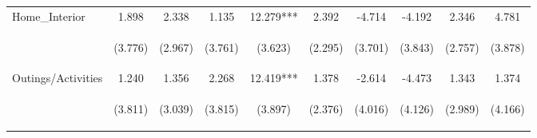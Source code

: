 \begin{tabular}{lccccccccc}
\noalign{\smallskip}Home_Interior & 1.898 & 2.338 & 1.135 & 12.279*** & 2.392 & -4.714 & -4.192 & 2.346 & 4.781\\
 & \begin{footnotesize}(3.776)\end{footnotesize} & \begin{footnotesize}(2.967)\end{footnotesize} & \begin{footnotesize}(3.761)\end{footnotesize} & \begin{footnotesize}(3.623)\end{footnotesize} & \begin{footnotesize}(2.295)\end{footnotesize} & \begin{footnotesize}(3.701)\end{footnotesize} & \begin{footnotesize}(3.843)\end{footnotesize} & \begin{footnotesize}(2.757)\end{footnotesize} & \begin{footnotesize}(3.878)\end{footnotesize}\\
\noalign{\smallskip}Outings/Activities & 1.240 & 1.356 & 2.268 & 12.419*** & 1.378 & -2.614 & -4.473 & 1.343 & 1.374\\
 & \begin{footnotesize}(3.811)\end{footnotesize} & \begin{footnotesize}(3.039)\end{footnotesize} & \begin{footnotesize}(3.815)\end{footnotesize} & \begin{footnotesize}(3.897)\end{footnotesize} & \begin{footnotesize}(2.376)\end{footnotesize} & \begin{footnotesize}(4.016)\end{footnotesize} & \begin{footnotesize}(4.126)\end{footnotesize} & \begin{footnotesize}(2.989)\end{footnotesize} & \begin{footnotesize}(4.166)\end{footnotesize}\\

\end{tabular}
